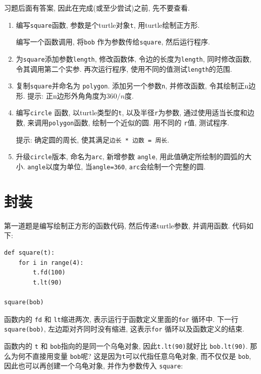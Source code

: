 \documentclass[10pt]{book}
\begin{document}
习题后面有答案, 因此在完成(或至少尝试)之前, 先不要查看. 

\begin{enumerate}

\item 编写{\tt square}函数, 参数是个turtle对象{\tt t}, 用turtle绘制正方形. 

编写一个函数调用, 将{\tt bob} 作为参数传给{\tt square}, 然后运行程序. 

\item 为{\tt square}添加参数{\tt length}, 修改函数体, 令边的长度为{\tt length}, 
同时修改函数, 令其调用第二个实参. 再次运行程序, 使用不同的值测试{\tt length}的范围. 

\item 复制{\tt square}并命名为 {\tt polygon}. 添加另一个参数{\tt n},
并修改函数, 令其绘制正n边形. 提示: 正n边形外角角度为$360/n$度. 

\item 编写{\tt circle} 函数, 以turtle类型的{\tt t}, 以及半径{\tt r}为参数, 
通过使用适当长度和边数, 来调用{\tt polygon}函数, 绘制一个近似的圆. 
用不同的 {\tt r}值, 测试程序.  

提示: 确定圆的周长, 使其满足{\tt 边长 * 边数 = 周长}.

\item 升级{\tt circle}版本, 命名为{\tt arc}, 新增参数 {\tt angle}, 
用此值确定所绘制的圆弧的大小. 
{\tt angle}以度为单位, 当{\tt angle=360}, {\tt arc}会绘制一个完整的圆. 

\end{enumerate}


\section{封装}

第一道题是编写绘制正方形的函数代码, 然后传递turtle参数, 并调用函数. 
代码如下:

\begin{verbatim}
def square(t):
    for i in range(4):
        t.fd(100)
        t.lt(90)

square(bob)
\end{verbatim}
%
函数内的 {\tt fd} 和 {\tt lt}缩进两次, 表示运行于函数定义里面的{\tt for} 循环中. 
下一行 {\tt square(bob)}, 左边距对齐同时没有缩进, 
这表示{\tt for} 循环以及函数定义的结束. 

函数内的 {\tt t} 和 {\tt bob}指向的是同一个乌龟对象, 
因此{\tt t.lt(90)}就好比 {\tt bob.lt(90)}. 
那么为何不直接用变量 {\tt bob}呢?
这是因为{\tt t}可以代指任意乌龟对象, 而不仅仅是 {\tt bob}, 
因此也可以再创建一个乌龟对象, 并作为参数传入 {\tt square}:
\end{document}
